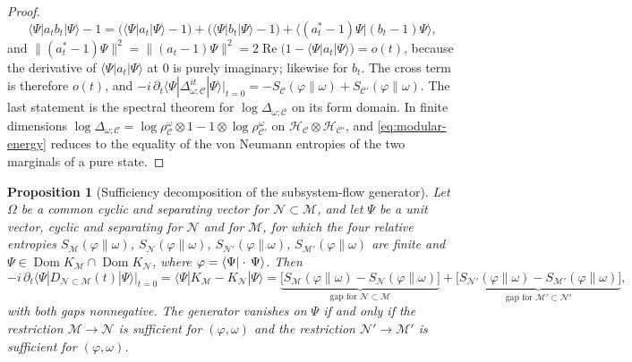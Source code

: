 \documentclass[a4paper,11pt]{article}
\newtheorem{proposition}[theorem]{Proposition}
\theoremstyle{definition}
\newcommand{\mN}{\mathcal{N}}
\newcommand{\mM}{\mathcal{M}}
\begin{document}
\begin{proof}
\begin{equation}
 \langle\Psi|a_tb_t|\Psi\rangle-1
 =\bigl(\langle\Psi|a_t|\Psi\rangle-1\bigr)+\bigl(\langle\Psi|b_t|\Psi\rangle-1\bigr)
 +\langle(a_t^*-1)\Psi|(b_t-1)\Psi\rangle,
\end{equation}
and $\|(a_t^*-1)\Psi\|^2=\|(a_t-1)\Psi\|^2=2\operatorname{Re}\bigl(1-\langle\Psi|a_t|\Psi\rangle\bigr)=o(t)$, because the derivative of $\langle\Psi|a_t|\Psi\rangle$ at $0$ is purely imaginary; likewise for $b_t$. The cross term is therefore $o(t)$, and
$-i\,\partial_t\langle\Psi|\Delta_{\omega;\mathcal C}^{it}|\Psi\rangle|_{t=0}=-S_{\mathcal C}(\varphi\|\omega)+S_{\mathcal C'}(\varphi\|\omega)$. The last statement is the spectral theorem for $\log\Delta_{\omega;\mathcal C}$ on its form domain. In finite dimensions $\log\Delta_{\omega;\mathcal C}=\log\rho^\omega_{\mathcal C}\otimes1-1\otimes\log\rho^\omega_{\mathcal C'}$ on $\mathcal H_{\mathcal C}\otimes\mathcal H_{\mathcal C'}$, and \eqref{eq:modular-energy} reduces to the equality of the von Neumann entropies of the two marginals of a pure state.
\end{proof}

\begin{proposition}[Sufficiency decomposition of the subsystem-flow generator]\label{prop:sufficiency}
Let $\Omega$ be a common cyclic and separating vector for $\mN\subset\mM$, and let $\Psi$ be a unit vector, cyclic and separating for $\mN$ and for $\mM$, for which the four relative entropies $S_{\mM}(\varphi\|\omega)$, $S_{\mN}(\varphi\|\omega)$, $S_{\mN'}(\varphi\|\omega)$, $S_{\mM'}(\varphi\|\omega)$ are finite and $\Psi\in\operatorname{Dom}K_{\mM}\cap\operatorname{Dom}K_{\mN}$, where $\varphi=\braket{\Psi|\cdot\,\Psi}$. Then
\begin{equation}
 -i\,\partial_t\langle\Psi|D_{\mN\subset\mM}(t)|\Psi\rangle\big|_{t=0}
 =\langle\Psi|K_{\mM}-K_{\mN}|\Psi\rangle
 =\underbrace{\bigl[S_{\mM}(\varphi\|\omega)-S_{\mN}(\varphi\|\omega)\bigr]}_{\text{gap for }\mN\subset\mM}
 +\underbrace{\bigl[S_{\mN'}(\varphi\|\omega)-S_{\mM'}(\varphi\|\omega)\bigr]}_{\text{gap for }\mM'\subset\mN'} ,
 \label{eq:sufficiency-decomposition}
\end{equation}
with both gaps nonnegative. The generator vanishes on $\Psi$ if and only if the restriction $\mM\to\mN$ is sufficient for $(\varphi,\omega)$ and the restriction $\mN'\to\mM'$ is sufficient for $(\varphi,\omega)$.
\end{proposition}
\end{document}
